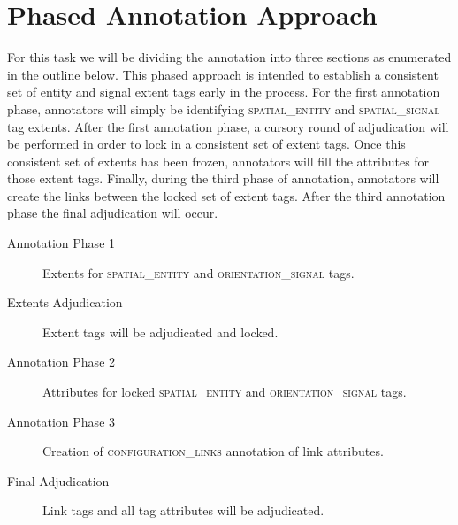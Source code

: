 \documentclass[11pt]{article}
\begin{document}




\section{Phased Annotation Approach} %
\label{sec:phased_annotation_approach}

For this task we will be dividing the annotation into three sections as enumerated in the outline below. This phased approach is intended to establish a consistent set of entity and signal extent tags early in the process. For the first annotation phase, annotators will simply be identifying \textsc{spatial\_entity} and \textsc{spatial\_signal} tag extents. After the first annotation phase, a cursory round of adjudication will be performed in order to lock in a consistent set of extent tags. Once this consistent set of extents has been frozen, annotators will fill the attributes for those extent tags. Finally, during the third phase of annotation, annotators will create the links between the locked set of extent tags. After the third annotation phase the final adjudication will occur.

\begin{description}
    \item[Annotation Phase 1] Extents for \textsc{spatial\_entity} and \textsc{orientation\_signal} tags.
    \item[Extents Adjudication] Extent tags will be adjudicated and locked.
    \item[Annotation Phase 2] Attributes for locked \textsc{spatial\_entity} and \textsc{orientation\_signal} tags.
    \item[Annotation Phase 3] Creation of \textsc{configuration\_links} annotation of link attributes.
    \item[Final Adjudication] Link tags and all tag attributes will be adjudicated.
\end{description}
\label{desc:phases}


\end{document}
